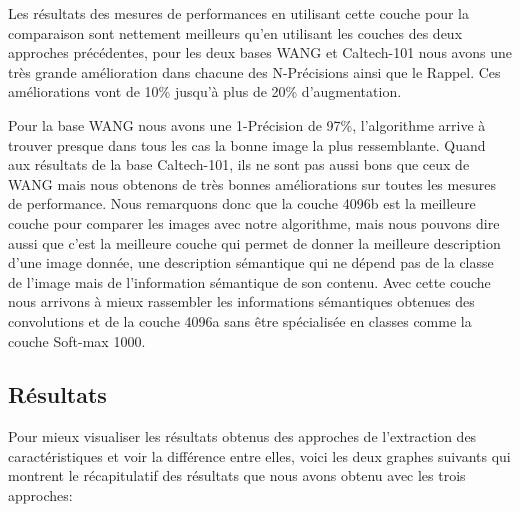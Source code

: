 	Les résultats des mesures de performances en utilisant cette couche pour la comparaison sont nettement meilleurs qu'en utilisant les couches des deux approches précédentes, pour les deux bases WANG et Caltech-101 nous avons une très grande amélioration dans chacune des N-Précisions ainsi que le Rappel. Ces améliorations vont de 10\% jusqu'à plus de 20\% d'augmentation.
	
	Pour la base WANG nous avons une 1-Précision de 97\%, l'algorithme arrive à trouver presque dans tous les cas la bonne image la plus ressemblante. Quand aux résultats de la base Caltech-101, ils ne sont pas aussi bons que ceux de WANG mais nous obtenons de très bonnes améliorations sur toutes les mesures de performance. 
	Nous remarquons donc que la couche 4096b est la meilleure couche pour comparer les images avec notre algorithme, mais nous pouvons dire aussi que c'est la meilleure couche qui permet de donner la meilleure description d'une image donnée, une description sémantique qui ne dépend pas de la classe de l'image mais de l'information sémantique de son contenu. Avec cette couche nous arrivons à mieux rassembler les informations sémantiques obtenues des convolutions et de la couche 4096a sans être spécialisée en classes comme la couche Soft-max 1000.
	
\subsection{Résultats}

	Pour mieux visualiser les résultats obtenus des approches de l'extraction des caractéristiques et voir la différence entre elles, voici les deux graphes suivants qui montrent le récapitulatif des résultats que nous avons obtenu avec les trois approches:


